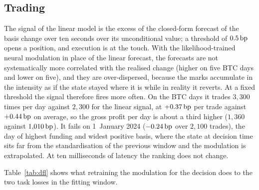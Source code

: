 \documentclass[a4paper,11pt]{article}
\begin{document}
\subsection{Trading}

The signal of the linear model is the excess of the closed-form forecast of the basis change over ten seconds over its unconditional value; a threshold of $0.5\,\mathrm{bp}$ opens a position, and execution is at the touch. With the likelihood-trained neural modulation in place of the linear forecast, the forecasts are not systematically more correlated with the realised change (higher on five BTC days and lower on five), and they are over-dispersed, because the marks accumulate in the intensity as if the state stayed where it is while in reality it reverts. At a fixed threshold the signal therefore fires more often. On the BTC days it trades $3{,}300$ times per day against $2{,}300$ for the linear signal, at $+0.37\,\mathrm{bp}$ per trade against $+0.44\,\mathrm{bp}$ on average, so the gross profit per day is about a third higher ($1{,}360$ against $1{,}010\,\mathrm{bp}$). It fails on 1~January 2024 ($-0.24\,\mathrm{bp}$ over $2{,}100$ trades), the day of highest funding and widest positive basis, where the state at decision time sits far from the standardisation of the previous window and the modulation is extrapolated. At ten milliseconds of latency the ranking does not change.

Table~\ref{tab:dfl} shows what retraining the modulation for the decision does to the two task losses in the fitting window.
\end{document}
